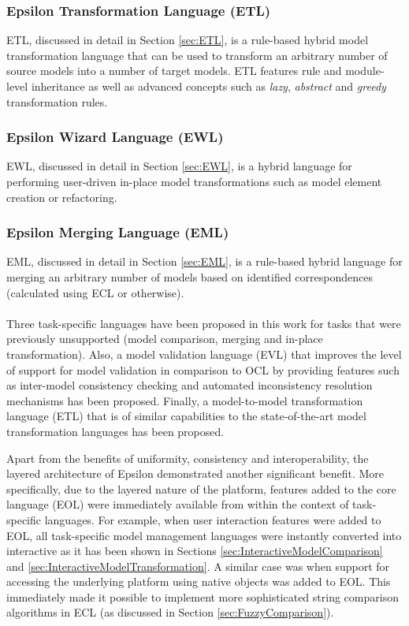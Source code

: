 \subsubsection{Epsilon Transformation Language (ETL)} ETL, discussed in detail in Section \ref{sec:ETL}, is a rule-based hybrid model transformation language that can be used to transform an arbitrary number of source models into a number of target models. ETL features rule and module-level inheritance as well as advanced concepts such as \emph{lazy}, \emph{abstract} and \emph{greedy} transformation rules.

\subsubsection{Epsilon Wizard Language (EWL)} EWL, discussed in detail in Section \ref{sec:EWL}, is a hybrid language for performing user-driven in-place model transformations such as model element creation or refactoring.

\subsubsection{Epsilon Merging Language (EML)} EML, discussed in detail in Section \ref{sec:EML}, is a rule-based hybrid language for merging an arbitrary number of models based on identified correspondences (calculated using ECL or otherwise).\\\\

Three task-specific languages have been proposed in this work for tasks that were previously unsupported (model comparison, merging and in-place transformation). Also, a model validation language (EVL) that improves the level of support for model validation in comparison to OCL by providing features such as inter-model consistency checking and automated inconsistency resolution mechanisms has been proposed. Finally, a model-to-model transformation language (ETL) that is of similar capabilities to the state-of-the-art model transformation languages has been proposed.

Apart from the benefits of uniformity, consistency and interoperability, the layered architecture of Epsilon demonstrated another significant benefit. More specifically, due to the layered nature of the platform, features added to the core language (EOL) were immediately available from within the context of task-specific languages. For example, when user interaction features were added to EOL, all task-specific model management languages were instantly converted into interactive as it has been shown in Sections \ref{sec:InteractiveModelComparison} and \ref{sec:InteractiveModelTransformation}. A similar case was when support for accessing the underlying platform using native objects was added to EOL. This immediately made it possible to implement more sophisticated string comparison algorithms in ECL (as discussed in Section  \ref{sec:FuzzyComparison}).

